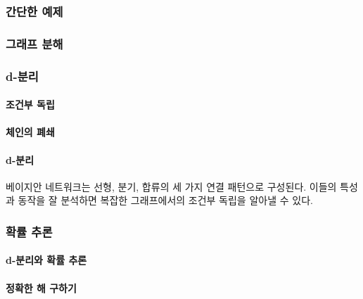 \documentclass [12pt] {oblivoir}
\let\oldsubsubsection=\subsubsection
\renewcommand{\subsubsection}
{
  \filbreak
  \oldsubsubsection
}
\begin{document}
\vspace{3mm}

\subsubsection{간단한 예제}

\subsubsection{그래프 분해}

\subsubsection{d-분리}

\paragraph*{조건부 독립}\mbox{}

\vspace{3mm}

\paragraph*{체인의 폐쇄}\mbox{}

\vspace{3mm}

\paragraph*{d-분리}\mbox{}

베이지안 네트워크는 선형, 분기, 합류의 세 가지 연결 패턴으로 구성된다.
이들의 특성과 동작을 잘 분석하면 복잡한 그래프에서의 조건부 독립을 알아낼 수 있다.

\vspace{3mm}

\subsubsection{확률 추론}

\paragraph*{d-분리와 확률 추론}\mbox{}

\vspace{3mm}

\paragraph*{정확한 해 구하기}\mbox{}
\end{document}
